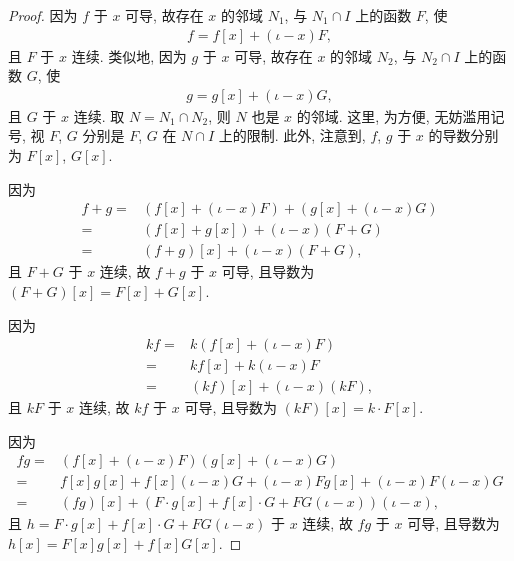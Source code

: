 \begin{proof}
    因为 $f$ 于 $x$ 可导,
    故存在 $x$ 的邻域 $N_1$, 与 $N_1 \cap I$ 上的函数 $F$,
    使
    \begin{align*}
        f = f[x] + (\iota - x)F,
    \end{align*}
    且 $F$ 于 $x$ 连续.
    类似地,
    因为 $g$ 于 $x$ 可导,
    故存在 $x$ 的邻域 $N_2$, 与 $N_2 \cap I$ 上的函数 $G$,
    使
    \begin{align*}
        g = g[x] + (\iota - x)G,
    \end{align*}
    且 $G$ 于 $x$ 连续.
    取 $N = N_1 \cap N_2$, 则 $N$ 也是 $x$ 的邻域.
    这里, 为方便, 无妨滥用记号,
    视 $F$, $G$ 分别是 $F$, $G$ 在 $N \cap I$ 上的限制.
    此外, 注意到,
    $f$, $g$ 于 $x$ 的导数分别为 $F[x]$, $G[x]$.

    因为
    \begin{align*}
        f + g
        = {} & (f[x] + (\iota - x)F) + (g[x] + (\iota - x)G) \\
        = {} & (f[x] + g[x]) + (\iota - x)(F + G)            \\
        = {} & (f + g)[x] + (\iota - x)(F + G),
    \end{align*}
    且 $F + G$ 于 $x$ 连续,
    故 $f + g$ 于 $x$ 可导,
    且导数为 $(F + G)[x] = F[x] + G[x]$.

    因为
    \begin{align*}
        kf
        = {} & k(f[x] + (\iota - x)F)     \\
        = {} & kf[x] + k(\iota - x)F      \\
        = {} & (kf)[x] + (\iota - x)(kF),
    \end{align*}
    且 $kF$ 于 $x$ 连续,
    故 $kf$ 于 $x$ 可导,
    且导数为 $(kF)[x] = k \cdot F[x]$.

    因为
    \begin{align*}
        fg
        = {} & (f[x] + (\iota - x)F)(g[x] + (\iota - x)G)                                \\
        = {} & f[x]g[x] + f[x](\iota - x)G + (\iota - x)Fg[x] + (\iota - x)F(\iota - x)G \\
        = {} & (fg)[x] + (F \cdot g[x] + f[x] \cdot G + FG(\iota - x))(\iota - x),
    \end{align*}
    且
    $h = F \cdot g[x] + f[x] \cdot G + FG(\iota - x)$
    于 $x$ 连续,
    故 $fg$ 于 $x$ 可导,
    且导数为 $h[x] = F[x]g[x] + f[x]G[x]$.


\end{proof}
